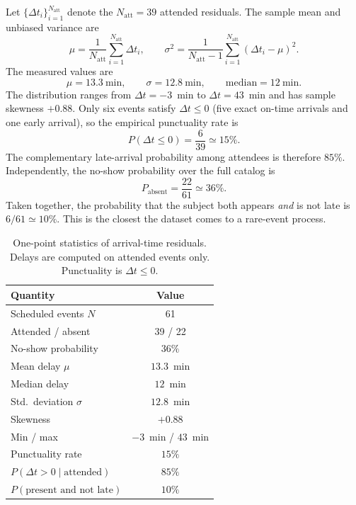 \documentclass[10pt,twocolumn]{article}
\begin{document}
Let $\{\Delta t_i\}_{i=1}^{N_{\mathrm{att}}}$ denote the
$N_{\mathrm{att}}=39$ attended residuals. The sample mean and
unbiased variance are
\begin{equation}
    \mu =
    \frac{1}{N_{\mathrm{att}}}
    \sum_{i=1}^{N_{\mathrm{att}}} \Delta t_i,
    \qquad
    \sigma^2 =
    \frac{1}{N_{\mathrm{att}}-1}
    \sum_{i=1}^{N_{\mathrm{att}}}
    (\Delta t_i - \mu)^2.
\end{equation}
The measured values are
\begin{equation}
    \mu = 13.3~\mathrm{min},
    \qquad
    \sigma = 12.8~\mathrm{min},
    \qquad
    \mathrm{median} = 12~\mathrm{min}.
\end{equation}
The distribution ranges from $\Delta t=-3$~min to
$\Delta t=43$~min and has sample skewness $+0.88$.
Only six events satisfy $\Delta t\le 0$ (five exact on-time
arrivals and one early arrival), so the empirical punctuality
rate is
\begin{equation}
    P(\Delta t\le 0)
    = \frac{6}{39} \simeq 15\%.
\end{equation}
The complementary late-arrival probability among attendees is
therefore $85\%$. Independently, the no-show probability over
the full catalog is
\begin{equation}
    P_{\mathrm{absent}} = \frac{22}{61} \simeq 36\%.
\end{equation}
Taken together, the probability that the subject both appears
\emph{and} is not late is $6/61\simeq 10\%$. This is the closest
the dataset comes to a rare-event process.

\begin{table}[H]
\centering
\caption{One-point statistics of arrival-time residuals.
Delays are computed on attended events only.
Punctuality is $\Delta t\le 0$.}
\label{tab:core}
\small
\begin{tabular}{lc}
\toprule
Quantity & Value \\
\midrule
Scheduled events $N$ & 61 \\
Attended / absent & 39 / 22 \\
No-show probability & $36\%$ \\
Mean delay $\mu$ & $13.3$~min \\
Median delay & $12$~min \\
Std.\ deviation $\sigma$ & $12.8$~min \\
Skewness & $+0.88$ \\
Min / max & $-3$~min / $43$~min \\
Punctuality rate & $15\%$ \\
$P(\Delta t>0\mid\mathrm{attended})$ & $85\%$ \\
$P(\text{present and not late})$ & $10\%$ \\
\bottomrule
\end{tabular}
\end{table}
\end{document}
